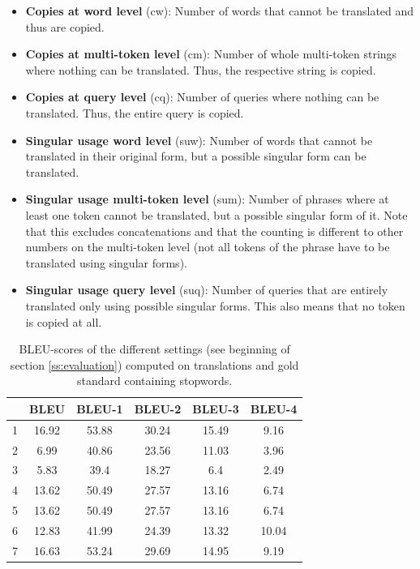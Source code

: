 \documentclass[a4paper,11pt]{article}
\begin{document}
\begin{itemize}
		\item \textbf{Copies at word level} (cw): Number of words that cannot be translated and thus are copied.
		\item \textbf{Copies at multi-token level} (cm): Number of whole multi-token strings where nothing can be translated. Thus, the respective string is copied.
		\item \textbf{Copies at query level} (cq): Number of queries where nothing can be translated. Thus, the entire query is copied.
		\item \textbf{Singular usage word level} (suw): Number of words that cannot be translated in their original form, but a possible singular form can be translated.
		\item \textbf{Singular usage multi-token level} (sum): Number of phrases where at least one token cannot be translated, but a possible singular form of it. Note that this excludes concatenations and that the counting is different to other numbers on the multi-token level (not all tokens of the phrase have to be translated using singular forms).
		\item \textbf{Singular usage query level} (suq): Number of queries that are entirely translated only using possible singular forms. This also means that no token is copied at all.
	\end{itemize}

\begin{table}[t]
	\begin{tabular}{c|c|c|c|c|c}
		&BLEU & BLEU-1 & BLEU-2 & BLEU-3 & BLEU-4\\
		\hline
	 1 & 16.92 & 53.88 & 30.24 & 15.49 & 9.16\\
	 2 & 6.99 &	40.86 &	23.56 &	11.03 &	3.96\\
	 3 & 5.83 &	39.4 & 18.27 & 6.4 & 2.49\\
	 4 & 13.62 & 50.49 & 27.57 & 13.16 & 6.74\\
	 5 & 13.62 & 50.49 & 27.57 & 13.16 & 6.74\\
	 6 & 12.83 & 41.99 & 24.39 & 13.32 & 10.04\\
	 7 & 16.63 & 53.24 & 29.69 & 14.95 & 9.19\\
	\end{tabular}
	\caption{BLEU-scores of the different settings (see beginning of section \ref{ss:evaluation}) computed on translations and gold standard containing stopwords.}
\label{tab:bleu_sw}
\end{table}
\end{document}

